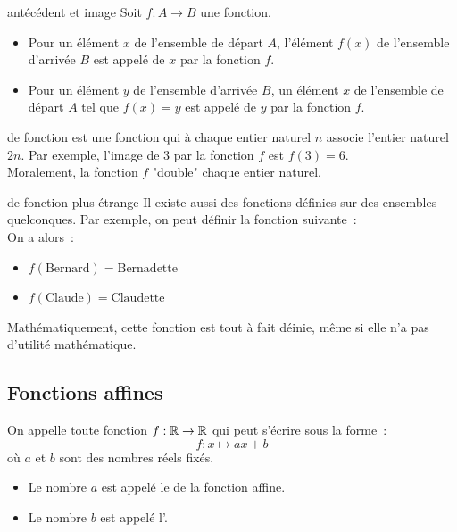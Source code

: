 \begin{definition}{}{antécédent et image}
    Soit \(f : A \to B\) une fonction.
    \begin{itemize}
        \item Pour un élément \(x\) de l'ensemble de départ \(A\), l'élément \(f(x)\) de l'ensemble d'arrivée \(B\) est appelé  de \(x\) par la fonction \(f\).
        \item Pour un élément \(y\) de l'ensemble d'arrivée \(B\), un élément \(x\) de l'ensemble de départ \(A\) tel que \(f(x) = y\) est appelé  de \(y\) par la fonction \(f\).
    \end{itemize}
\end{definition}

\begin{exemple}{}{de fonction}
    est une fonction qui à chaque entier naturel \(n\) associe l'entier naturel \(2n\). Par exemple, l'image de \(3\) par la fonction \(f\) est \(f(3) = 6\). \\
    Moralement, la fonction \(f\) "double" chaque entier naturel. \\
\end{exemple}

\begin{exemple}{}{de fonction plus étrange}
    Il existe aussi des fonctions définies sur des ensembles quelconques. Par exemple, on peut définir la fonction suivante~:
     \\
    On a alors~:
    \begin{itemize}
        \item $f(\text{Bernard}) = \text{Bernadette}$
        \item $f(\text{Claude}) = \text{Claudette}$
    \end{itemize}
    Mathématiquement, cette fonction est tout à fait déinie, même si elle n'a pas d'utilité mathématique.
\end{exemple}

\subsection{Fonctions affines}

On appelle  toute fonction \(f : \mathbb{R} \to \mathbb{R}\) qui peut s'écrire sous la forme~:
$$f : x \mapsto ax + b$$
où \(a\) et \(b\) sont des nombres réels fixés.
\begin{itemize}
    \item Le nombre \(a\) est appelé le  de la fonction affine.
    \item Le nombre \(b\) est appelé l'.
\end{itemize}

